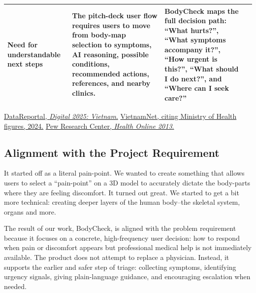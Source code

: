 \begin{table}[h!]
\begin{tabular}{@{} p{4cm} p{4.2cm} p{4.2cm} p{4cm} @{}}
    Need for understandable next steps &
    The pitch-deck user flow requires users to move from body-map selection
    to symptoms, AI reasoning, possible conditions, recommended actions,
    references, and nearby clinics. &
    BodyCheck maps the full decision path: ``What hurts?'', ``What symptoms
    accompany it?'', ``How urgent is this?'', ``What should I do next?'',
    and ``Where can I seek care?'' \\

    \bottomrule
  \end{tabular}

  \smallskip\noindent
  {\footnotesize
  \footnotemark[1]\href{https://datareportal.com/reports/digital-2025-vietnam}
  {DataReportal, \textit{Digital 2025: Vietnam}.}
  \quad
  \footnotemark[2]\href{https://vietnamnet.vn/en/vn-targets-15-doctors-per-10-000-people-by-2025-2254601.html}
  {VietnamNet, citing Ministry of Health figures, 2024.}
  \quad
  \footnotemark[3]\href{https://www.pewresearch.org/internet/2013/01/15/health-online-2013/}
  {Pew Research Center, \textit{Health Online 2013}.}
  }
\end{table}

\subsection{Alignment with the Project Requirement}
\label{sec:problem-fit-alignment}

It started off as a literal pain-point. We wanted to create something that allows users to select a “pain-point” on a 3D model to accurately dictate the body-parts where they are feeling discomfort. It turned out great. We started to get a bit more technical: creating deeper layers of the human body–the skeletal system, organs and more.

The result of our work, BodyCheck, is aligned with the problem requirement because it focuses on a
concrete, high-frequency user decision: how to respond when pain or discomfort
appears but professional medical help is not immediately available. The product
does not attempt to replace a physician. Instead, it supports the earlier and
safer step of triage: collecting symptoms, identifying urgency signals, giving
plain-language guidance, and encouraging escalation when needed.

